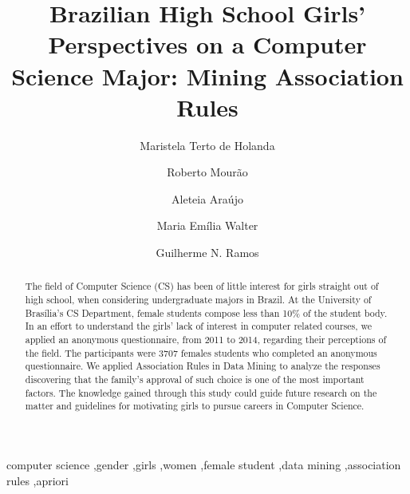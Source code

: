 \documentclass[preprint,12pt]{elsarticle}%
\begin{document}
\begin{frontmatter}



\title{Brazilian High School Girls' Perspectives on a Computer Science Major: Mining Association Rules}

\author{Maristela Terto de Holanda}%
%
%
\author{Roberto Mourão}%
\author{Aleteia Araújo}%
\author{Maria Emília Walter}%
\author{Guilherme N. Ramos}%



\address{Department of Computer Science, University of Brasília, Brasília, Brazil}%

\begin{abstract}
The field of Computer Science (CS) has been of little interest for girls straight out of high school, when considering undergraduate majors in Brazil. At the University of Brasília’s CS Department, female students compose less than 10\% of the student body. In an effort to understand the girls’ lack of interest in computer related courses, we applied an anonymous questionnaire, from 2011 to 2014, regarding their perceptions of the field.  The participants were 3707 females students who completed an anonymous questionnaire. We applied Association Rules in Data Mining to analyze the responses discovering that the family's approval of such choice is one of the most important factors. The knowledge gained through this study could guide future research on the matter and guidelines for motivating girls to pursue careers in Computer Science.
\end{abstract}

\begin{keyword}
computer science \sep gender \sep girls \sep women \sep female student \sep data mining \sep association rules \sep apriori%


\end{keyword}

\end{frontmatter}
\end{document}
